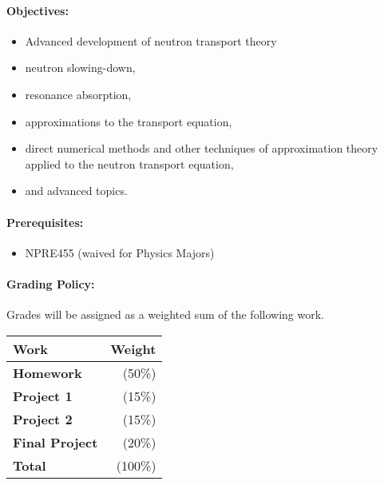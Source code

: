 \documentclass[11pt, a4paper]{article}
\begin{document}

\renewcommand{\refname}{\normalfont\selectfont\normalsize}\vspace{-1cm}


\paragraph{Objectives:}
\begin{itemize}
\item Advanced development of neutron transport theory
\item  neutron slowing-down,
\item resonance absorption,
\item  approximations to the transport equation,
\item  direct numerical methods and other techniques of approximation theory 
        applied to the neutron transport equation,
\item  and advanced topics. 
\end{itemize}

\paragraph{Prerequisites:}
\begin{itemize}
\item NPRE455 (waived for Physics Majors) 
\end{itemize}

\paragraph{Grading Policy:} Grades will be assigned as a weighted sum of the
following work.

\begin{table}[h]
\begin{tabularx}{\textwidth}{Xr}
        \textbf{Work} & \textbf{Weight} \\
\hline
\textbf{Homework}    & (50\%)  \\
\textbf{Project 1}    & (15\%)  \\
\textbf{Project 2}    & (15\%)  \\
\textbf{Final Project}  & (20\%)  \\
\hline
\textbf{Total}       & (100\%)\\
\end{tabularx}
\end{table}
\end{document}
